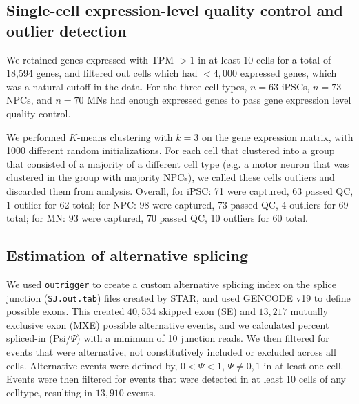 

\subsection{Single-cell expression-level quality control and outlier detection}

We retained genes expressed with TPM $> 1$ in at least 10 cells for a total of 18,594 genes, and filtered out cells which had $<4,000$ expressed genes, which was a natural cutoff in the data. For the three cell types, $n=63$ iPSCs, $n=73$ NPCs, and $n=70$ MNs had enough expressed genes to pass gene expression level quality control.


We performed $K$-means clustering with $k=3$ on the gene expression matrix, with 1000 different random initializations. For each cell that clustered into a group that consisted of a majority of a different cell type (e.g. a motor neuron that was clustered in the group with majority NPCs), we called these cells outliers and discarded them from analysis. Overall, for iPSC: 71 were captured, 63 passed  QC,  1 outlier for 62 total; for NPC: $98$ were captured, 73 passed QC, 4 outliers for 69 total; for MN: $93$ were captured,  70 passed QC, 10 outliers for 60 total.



\subsection{Estimation of alternative splicing}
We used \texttt{outrigger} to create a custom alternative splicing index on the splice junction (\texttt{SJ.out.tab}) files created by STAR, and used GENCODE v19 to define possible exons. This created $40,534$ skipped exon (SE) and $13,217$ mutually exclusive exon (MXE) possible alternative events, and we calculated percent spliced-in (Psi/$\Psi$) with a minimum of 10 junction reads. We then filtered for events that were alternative, not constitutively included or excluded across all cells. Alternative events were defined by, $0 < \Psi < 1$, $\Psi \neq 0, 1$ in at least one cell. Events were then filtered for events that were detected in at least 10 cells of any celltype, resulting in $13,910$ events.

